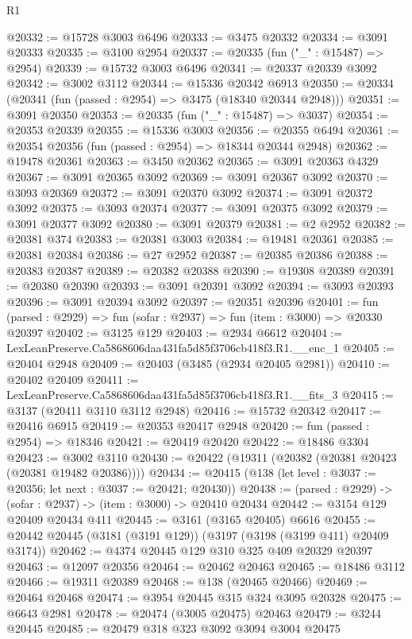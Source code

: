 \begin{lexlean}{R1}
\begin{coremodule}
@20332 := @15728 @3003 @6496
@20333 := @3475 @20332
@20334 := @3091 @20333
@20335 := @3100 @2954
@20337 := @20335 (fun ("_" : @15487) => @2954)
@20339 := @15732 @3003 @6496
@20341 := @20337 @20339 @3092
@20342 := @3002 @3112
@20344 := @15336 @20342 @6913
@20350 := @20334 (@20341 (fun (passed : @2954) => @3475 (@18340 @20344 @2948)))
@20351 := @3091 @20350
@20353 := @20335 (fun ("_" : @15487) => @3037)
@20354 := @20353 @20339
@20355 := @15336 @3003
@20356 := @20355 @6494
@20361 := @20354 @20356 (fun (passed : @2954) => @18344 @20344 @2948)
@20362 := @19478 @20361
@20363 := @3450 @20362
@20365 := @3091 @20363 @4329
@20367 := @3091 @20365 @3092
@20369 := @3091 @20367 @3092
@20370 := @3093 @20369
@20372 := @3091 @20370 @3092
@20374 := @3091 @20372 @3092
@20375 := @3093 @20374
@20377 := @3091 @20375 @3092
@20379 := @3091 @20377 @3092
@20380 := @3091 @20379
@20381 := @2 @2952
@20382 := @20381 @374
@20383 := @20381 @3003
@20384 := @19481 @20361
@20385 := @20381 @20384
@20386 := @27 @2952
@20387 := @20385 @20386
@20388 := @20383 @20387
@20389 := @20382 @20388
@20390 := @19308 @20389
@20391 := @20380 @20390
@20393 := @3091 @20391 @3092
@20394 := @3093 @20393
@20396 := @3091 @20394 @3092
@20397 := @20351 @20396
@20401 := fun (parsed : @2929) => fun (sofar : @2937) => fun (item : @3000) => @20330 @20397
@20402 := @3125 @129
@20403 := @2934 @6612
@20404 := LexLeanPreserve.Ca5868606daa431fa5d85f3706cb418f3.R1.__enc_1
@20405 := @20404 @2948
@20409 := @20403 (@3485 (@2934 @20405 @2981))
@20410 := @20402 @20409
@20411 := LexLeanPreserve.Ca5868606daa431fa5d85f3706cb418f3.R1.__fits_3
@20415 := @3137 (@20411 @3110 @3112 @2948)
@20416 := @15732 @20342
@20417 := @20416 @6915
@20419 := @20353 @20417 @2948
@20420 := fun (passed : @2954) => @18346
@20421 := @20419 @20420
@20422 := @18486 @3304
@20423 := @3002 @3110
@20430 := @20422 (@19311 (@20382 (@20381 @20423 (@20381 @19482 @20386))))
@20434 := @20415 (@138 (let level : @3037 := @20356; let next : @3037 := @20421; @20430))
@20438 := (parsed : @2929) -> (sofar : @2937) -> (item : @3000) -> @20410 @20434
@20442 := @3154 @129 @20409 @20434 @411
@20445 := @3161 (@3165 @20405) @6616
@20455 := @20442 @20445 (@3181 (@3191 @129)) (@3197 (@3198 (@3199 @411) @20409 @3174))
@20462 := @4374 @20445 @129 @310 @325 @409 @20329 @20397
@20463 := @12097 @20356
@20464 := @20462 @20463
@20465 := @18486 @3112
@20466 := @19311 @20389
@20468 := @138 (@20465 @20466)
@20469 := @20464 @20468
@20474 := @3954 @20445 @315 @324 @3095 @20328
@20475 := @6643 @2981
@20478 := @20474 (@3005 @20475) @20463
@20479 := @3244 @20445
@20485 := @20479 @318 @323 @3092 @3094 @3004 @20475

\end{coremodule}
\end{lexlean}
